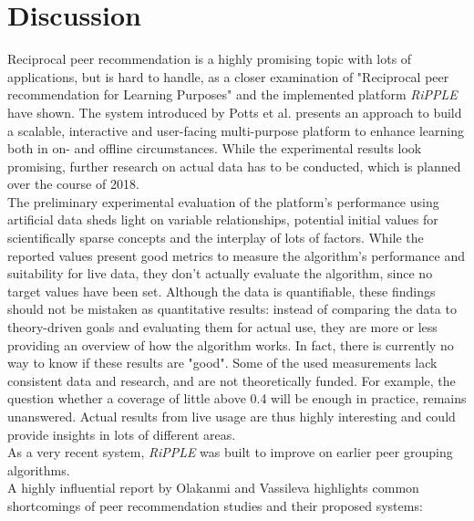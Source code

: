 \documentclass[conference]{IEEEtran}
\begin{document}
\section{Discussion} \label{extensions}\label{paper:discussion}
Reciprocal peer recommendation is a highly promising topic with lots of applications, but is hard to handle, as a closer examination of "Reciprocal peer recommendation for Learning Purposes" and the implemented platform \textit{RiPPLE} have shown. The system introduced by Potts et al. presents an approach to build a scalable, interactive and user-facing multi-purpose platform to enhance learning both in on- and offline circumstances. While the experimental results look promising, further research on actual data has to be conducted, which is planned over the course of 2018.\\
The preliminary experimental evaluation of the platform's performance using artificial data sheds light on variable relationships, potential initial values for scientifically sparse concepts and the interplay of lots of factors. While the reported values present good metrics to measure the algorithm's performance and suitability for live data, they don't actually evaluate the algorithm, since no target values have been set. Although the data is quantifiable, these findings should not be mistaken as quantitative results: instead of comparing the data to theory-driven goals and evaluating them for actual use, they are more or less providing an overview of how the algorithm works. In fact, there is currently no way to know if these results are "good". Some of the used measurements lack consistent data and research, and are not theoretically funded. For example, the question whether a coverage of little above 0.4 will be enough in practice, remains unanswered. Actual results from live usage are thus highly interesting and could provide insights in lots of different areas.\\
As a very recent system, \textit{RiPPLE} was built to improve on earlier peer grouping algorithms.\\
A highly influential report by Olakanmi and Vassileva \cite{olakanmi2017group} highlights common shortcomings of peer recommendation studies and their proposed systems:
\end{document}
